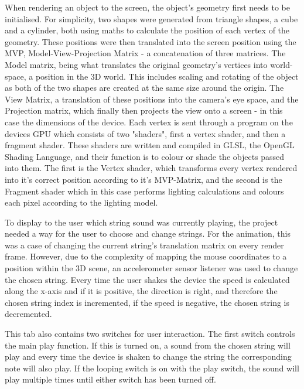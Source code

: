 \documentclass[conference]{acmsiggraph}
\begin{document}
When rendering an object to the screen, the object's geometry first needs to be initialised. For simplicity, two shapes were generated from triangle shapes, a cube and a cylinder, both using maths to calculate the position of each vertex of the geometry. These positions were then translated into the screen position using the MVP, Model-View-Projection Matrix - a concatenation of three matrices. The Model matrix, being what translates the original geometry's vertices into world-space, a position in the 3D world. This includes scaling and rotating of the object as both of the two shapes are created at the same size around the origin. The View Matrix, a translation of these positions into the camera's eye space, and the Projection matrix, which finally then projects the view onto a screen - in this case the dimensions of the device. Each vertex is sent through a program on the devices GPU which consists of two "shaders", first a vertex shader, and then a fragment shader. These shaders are written and compiled in GLSL, the OpenGL Shading Language, and their function is to colour or shade the objects passed into them. The first is the Vertex shader, which transforms every vertex rendered into it's correct position according to it's MVP-Matrix, and the second is the Fragment shader which in this case performs lighting calculations and colours each pixel according to the lighting model.

To display to the user which string sound was currently playing, the project needed a way for the user to choose and change strings. For the animation, this was a case of changing the current string's translation matrix on every render frame. However, due to the complexity of mapping the mouse coordinates to a position within the 3D scene, an accelerometer sensor listener was used to change the chosen string. Every time the user shakes the device the speed is calculated along the x-axis and if it is positive, the direction is right, and therefore the chosen string index is incremented, if the speed is negative, the chosen string is decremented.

This tab also contains two switches for user interaction. The first switch controls the main play function. If this is turned on, a sound from the chosen string will play and every time the device is shaken to change the string the corresponding note will also play. If the looping switch is on with the play switch, the sound will play multiple times until either switch has been turned off. 
\end{document}
